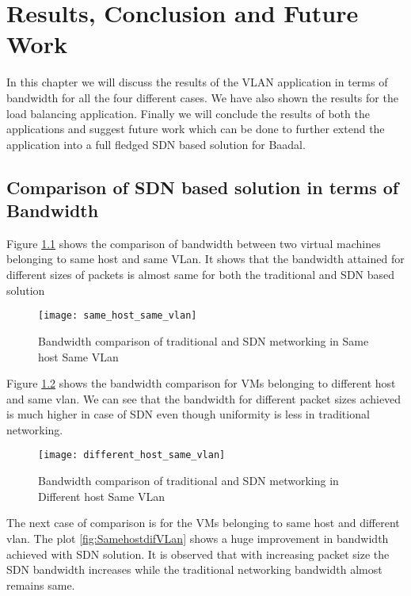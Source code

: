 \chapter{Results, Conclusion and Future Work}



In this chapter we will discuss the results of the VLAN application in terms of bandwidth for all the four different cases. We have also shown the results for the load balancing application. Finally we will conclude the results of both the applications and suggest future work which can be done to further extend the application into a full fledged SDN based solution for Baadal.

\section{Comparison of SDN based solution in terms of Bandwidth}

Figure \ref{fig:SamehostSameVLan} shows the comparison of bandwidth between two virtual machines belonging to same host and same VLan. It shows that the bandwidth attained for different sizes of packets is almost same for both the traditional and SDN based solution

\begin{figure}
\caption{Bandwidth comparison of traditional and SDN metworking in Same host Same VLan}
\centering
\texttt{[image: same\_host\_same\_vlan]}
\label{fig:SamehostSameVLan}
\end{figure}

\newpage
Figure \ref{fig:difhostsameVLan} shows the bandwidth comparison for VMs belonging to different host and same vlan. We can see that the bandwidth for different packet sizes achieved is much higher in case of SDN even though uniformity is less in traditional networking.
\begin{figure}
\caption{Bandwidth comparison of traditional and SDN metworking in Different host Same VLan}
\centering
\texttt{[image: different\_host\_same\_vlan]}
\label{fig:difhostsameVLan}
\end{figure}

\newpage

The next case of comparison is for the VMs belonging to same host and different vlan. The plot \ref{fig:SamehostdifVLan} shows a huge improvement in bandwidth achieved with SDN solution. It is observed that with increasing packet size the SDN bandwidth increases while the traditional networking bandwidth almost remains same.

